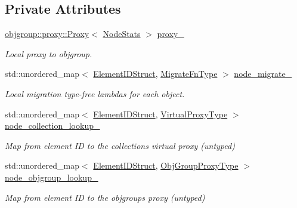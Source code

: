 \subsection*{Private Attributes}
\begin{DoxyCompactItemize}
\item 
\hyperlink{structvt_1_1objgroup_1_1proxy_1_1_proxy}{objgroup\+::proxy\+::\+Proxy}$<$ \hyperlink{structvt_1_1vrt_1_1collection_1_1balance_1_1_node_stats}{Node\+Stats} $>$ \hyperlink{structvt_1_1vrt_1_1collection_1_1balance_1_1_node_stats_ab0f4d7d14401bec36a6bfca304935032}{proxy\+\_\+}
\begin{DoxyCompactList}\small\item\em Local proxy to objgroup. \end{DoxyCompactList}\item 
std\+::unordered\+\_\+map$<$ \hyperlink{namespacevt_1_1vrt_1_1collection_1_1balance_a9f5b53fafb270212279a4757d2c4cd28}{Element\+I\+D\+Struct}, \hyperlink{structvt_1_1vrt_1_1collection_1_1balance_1_1_node_stats_af702e521887d9015e33a7aedda48d09d}{Migrate\+Fn\+Type} $>$ \hyperlink{structvt_1_1vrt_1_1collection_1_1balance_1_1_node_stats_ab18ecce80362dfce22c3cd0c740c9810}{node\+\_\+migrate\+\_\+}
\begin{DoxyCompactList}\small\item\em Local migration type-\/free lambdas for each object. \end{DoxyCompactList}\item 
std\+::unordered\+\_\+map$<$ \hyperlink{namespacevt_1_1vrt_1_1collection_1_1balance_a9f5b53fafb270212279a4757d2c4cd28}{Element\+I\+D\+Struct}, \hyperlink{namespacevt_a1b417dd5d684f045bb58a0ede70045ac}{Virtual\+Proxy\+Type} $>$ \hyperlink{structvt_1_1vrt_1_1collection_1_1balance_1_1_node_stats_af0ff96a05dc8b3cfb12307d3b9008b6f}{node\+\_\+collection\+\_\+lookup\+\_\+}
\begin{DoxyCompactList}\small\item\em Map from element ID to the collection\textquotesingle{}s virtual proxy (untyped) \end{DoxyCompactList}\item 
std\+::unordered\+\_\+map$<$ \hyperlink{namespacevt_1_1vrt_1_1collection_1_1balance_a9f5b53fafb270212279a4757d2c4cd28}{Element\+I\+D\+Struct}, \hyperlink{namespacevt_ad7cae989df485fccca57f0792a880a8e}{Obj\+Group\+Proxy\+Type} $>$ \hyperlink{structvt_1_1vrt_1_1collection_1_1balance_1_1_node_stats_a0333e2f4682c11110ec6b1a5a473e3d5}{node\+\_\+objgroup\+\_\+lookup\+\_\+}
\begin{DoxyCompactList}\small\item\em Map from element ID to the objgroup\textquotesingle{}s proxy (untyped) \end{DoxyCompactList}\item 

\end{DoxyCompactItemize}
